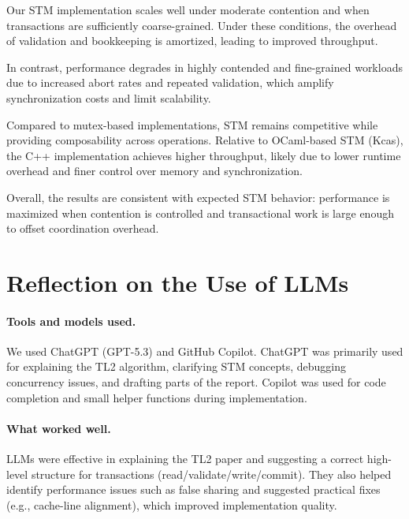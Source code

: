 \documentclass[11pt,a4paper]{article}
\begin{document}
Our STM implementation scales well under moderate contention and when transactions are sufficiently coarse-grained. Under these conditions, the overhead of validation and bookkeeping is amortized, leading to improved throughput.

In contrast, performance degrades in highly contended and fine-grained workloads due to increased abort rates and repeated validation, which amplify synchronization costs and limit scalability.

Compared to mutex-based implementations, STM remains competitive while providing composability across operations. Relative to OCaml-based STM (Kcas), the C++ implementation achieves higher throughput, likely due to lower runtime overhead and finer control over memory and synchronization.

Overall, the results are consistent with expected STM behavior: performance is maximized when contention is controlled and transactional work is large enough to offset coordination overhead.
\section{Reflection on the Use of LLMs}
\label{sec:llm}

\paragraph{Tools and models used.}
We used ChatGPT (GPT-5.3) and GitHub Copilot. ChatGPT was primarily used for explaining the TL2 algorithm, clarifying STM concepts, debugging concurrency issues, and drafting parts of the report. Copilot was used for code completion and small helper functions during implementation.

\paragraph{What worked well.}
LLMs were effective in explaining the TL2 paper and suggesting a correct high-level structure for transactions (read/validate/write/commit). They also helped identify performance issues such as false sharing and suggested practical fixes (e.g., cache-line alignment), which improved implementation quality.
\end{document}
